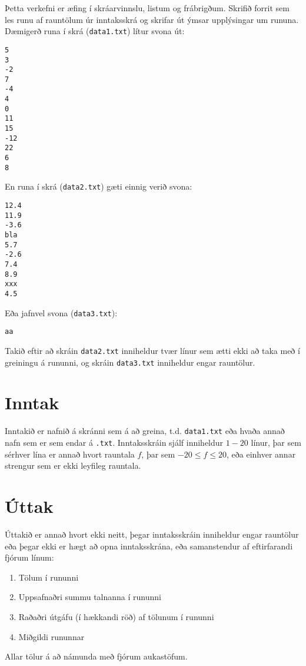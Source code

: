 
Þetta verkefni er æfing í skráarvinnslu, listum og frábrigðum.
Skrifið forrit sem les runu af rauntölum úr inntaksskrá og skrifar út ýmsar upplýsingar um rununa.
Dæmigerð runa í skrá (\texttt{data1.txt}) lítur svona út:

\begin{verbatim}
5
3
-2
7
-4
4
0
11
15
-12
22
6
8
\end{verbatim}

\noindent
En runa í skrá (\texttt{data2.txt}) gæti einnig verið svona:
\begin{verbatim}
12.4
11.9
-3.6
bla  
5.7
-2.6
7.4
8.9
xxx
4.5
\end{verbatim}

\noindent
Eða jafnvel svona (\texttt{data3.txt}):
\begin{verbatim}
aa
\end{verbatim}


Takið eftir að skráin \texttt{data2.txt} inniheldur tvær línur sem ætti ekki að taka með í greiningu á rununni, og skráin \texttt{data3.txt} inniheldur engar rauntölur.

\pagebreak

\section*{Inntak}
Inntakið er nafnið á skránni sem á að greina, t.d. \texttt{data1.txt} eða hvaða annað nafn sem er sem endar á \texttt{.txt}.
Inntaksskráin sjálf inniheldur $1-20$ línur, þar sem sérhver lína er annað hvort rauntala $f$, þar sem $-20 \le f \le 20$, eða einhver annar strengur sem er ekki leyfileg rauntala.

\section*{Úttak}
Úttakið er annað hvort ekki neitt, þegar inntaksskráin inniheldur engar rauntölur eða þegar ekki er hægt að opna inntaksskrána, eða samanstendur af eftirfarandi fjórum línum:
\begin{enumerate}
    \item Tölum í rununni
    \item Uppsafnaðri summu talnanna í rununni
    \item Raðaðri útgáfu (í hækkandi röð) af tölunum í rununni 
    \item Miðgildi rununnar
\end{enumerate}

Allar tölur á að námunda með fjórum aukastöfum. 

